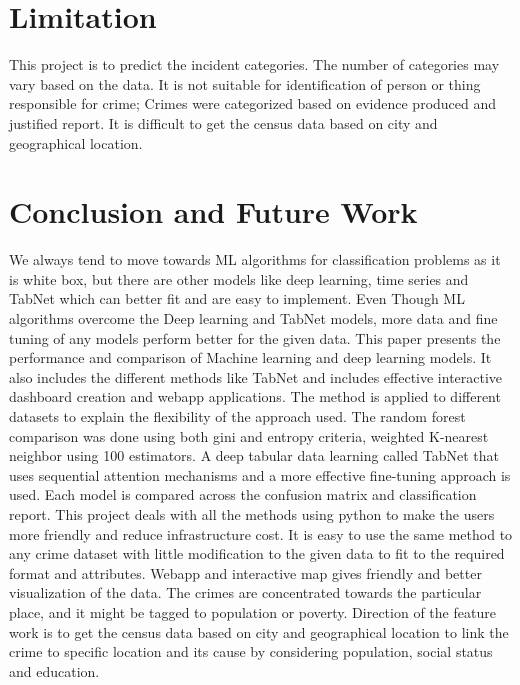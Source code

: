 \documentclass[conference,final,]{IEEEtran}
\begin{document}
\section{Limitation}\label{limitation}

This project is to predict the incident categories. The number of
categories may vary based on the data. It is not suitable for
identification of person or thing responsible for crime; Crimes were
categorized based on evidence produced and justified report. It is
difficult to get the census data based on city and geographical
location.

\section{Conclusion and Future Work}\label{conclusion-and-future-work}

We always tend to move towards ML algorithms for classification problems
as it is white box, but there are other models like deep learning, time
series and TabNet which can better fit and are easy to implement. Even
Though ML algorithms overcome the Deep learning and TabNet models, more
data and fine tuning of any models perform better for the given data.
This paper presents the performance and comparison of Machine learning
and deep learning models. It also includes the different methods like
TabNet and includes effective interactive dashboard creation and webapp
applications. The method is applied to different datasets to explain the
flexibility of the approach used. The random forest comparison was done
using both gini and entropy criteria, weighted K-nearest neighbor using
100 estimators. A deep tabular data learning called TabNet that uses
sequential attention mechanisms and a more effective fine-tuning
approach is used. Each model is compared across the confusion matrix and
classification report. This project deals with all the methods using
python to make the users more friendly and reduce infrastructure cost.
It is easy to use the same method to any crime dataset with little
modification to the given data to fit to the required format and
attributes. Webapp and interactive map gives friendly and better
visualization of the data. The crimes are concentrated towards the
particular place, and it might be tagged to population or poverty.
Direction of the feature work is to get the census data based on city
and geographical location to link the crime to specific location and its
cause by considering population, social status and education.
\end{document}
